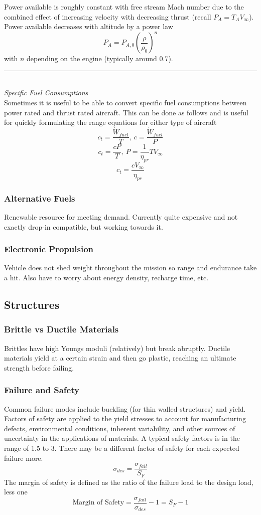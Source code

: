 \documentclass[12pt]{article}
\newcommand{\Header}[1]{\noindent\rule{\textwidth}{0.4pt}\\\large{\textit{#1}}\normalsize{}}
\newcommand{\Vinfty}{V_\infty}
\begin{document}
Power available is roughly constant with free stream Mach number due to the combined effect of increasing velocity with decreasing thrust (recall $P_A=T_A\Vinfty$). Power available decreases with altitude by a power law
$$P_A=P_{A,0}\left(\frac{\rho}{\rho_0}\right)^n$$
with $n$ depending on the engine (typically around 0.7).\\

\Header{Specific Fuel Consumptions}\\

Sometimes it is useful to be able to convert specific fuel consumptions between power rated and thrust rated aircraft. This can be done as follows and is useful for quickly formulating the range equations for either type of aircraft
$$c_t = \frac{\dot{W}_{fuel}}{T},\ c = \frac{\dot{W}_{fuel}}{P}$$
$$c_t = \frac{cP}{T},\ P = \frac{1}{\eta_{pr}}T\Vinfty$$
$$c_t = \frac{c\Vinfty}{\eta_{pr}}$$

\subsubsection{Alternative Fuels}
Renewable resource for meeting demand. Currently quite expensive and not exactly drop-in compatible, but working towards it.
\subsubsection{Electronic Propulsion}
Vehicle does not shed weight throughout the mission so range and endurance take a hit. Also have to worry about energy density, recharge time, etc.

\subsection{Structures}
\subsubsection{Brittle vs Ductile Materials}
Brittles have high Youngs moduli (relatively) but break abruptly. Ductile materials yield at a certain strain and then go plastic, reaching an ultimate strength before failing.
\subsubsection{Failure and Safety}
Common failure modes include buckling (for thin walled structures) and yield. Factors of safety are applied to the yield stresses to account for manufacturing defects, environmental conditions, inherent variability, and other sources of uncertainty in the applications of materials. A typical safety factors is in the range of 1.5 to 3. There may be a different factor of safety for each expected failure more.
$$\sigma_{des} = \frac{\sigma_{fail}}{S_F}$$
The margin of safety is defined as the ratio of the failure load to the design load, less one
$$\textrm{Margin of Safety} = \frac{\sigma_{fail}}{\sigma_{des}}-1 = S_F-1$$
\end{document}
